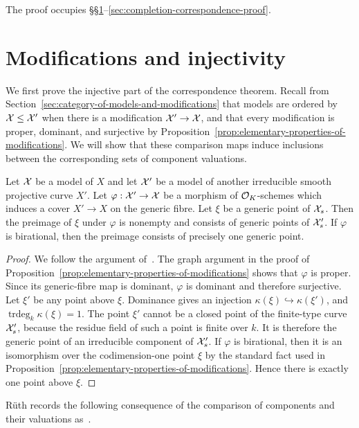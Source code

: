 \medskip\noindent
The proof occupies \S\S\ref{sec:modifications-and-injectivity}--\ref{sec:completion-correspondence-proof}.

\section{Modifications and injectivity}\label{sec:modifications-and-injectivity}
We first prove the injective part of the correspondence theorem.
Recall from Section~\ref{sec:category-of-models-and-modifications} that models are ordered by $\mathcal X\leq\mathcal X'$ when there is a modification $\mathcal X'\to\mathcal X$, and that every modification is proper, dominant, and surjective by Proposition~\ref{prop:elementary-properties-of-modifications}.
We will show that these comparison maps induce inclusions between the corresponding sets of component valuations.

\begin{lemma}\label{lem:preimageOfGenericPoint}
    Let $\mathcal X$ be a model of $X$ and let $\mathcal X'$ be a model of another irreducible smooth projective curve $X'$.
    Let $\varphi: \mathcal X' \to \mathcal X$ be a morphism of $\mathcal O_K $-schemes which induces a cover $X' \to X$ on the generic fibre.
    Let $\xi$ be a generic point of $\mathcal X_s$.
    Then the preimage of $\xi$ under $\varphi$ is nonempty and consists of generic points of $\mathcal X_s'$.
    If $\varphi$ is birational, then the preimage consists of precisely one generic point.
\end{lemma}

\begin{proof}
    We follow the argument of~\cite[Lemma 3.6]{Rueth}.
    The graph argument in the proof of Proposition~\ref{prop:elementary-properties-of-modifications} shows that $\varphi$ is proper.
    Since its generic-fibre map is dominant, $\varphi$ is dominant and therefore surjective.
    Let $\xi'$ be any point above $\xi$.
    Dominance gives an injection $\kappa(\xi)\hookrightarrow\kappa(\xi')$, and $\operatorname{trdeg}_k\kappa(\xi)=1$.
    The point $\xi'$ cannot be a closed point of the finite-type curve $\mathcal X'_s$, because the residue field of such a point is finite over $k$.
    It is therefore the generic point of an irreducible component of $\mathcal X'_s$.
    If $\varphi$ is birational, then it is an isomorphism over the codimension-one point $\xi$ by the standard fact used in Proposition~\ref{prop:elementary-properties-of-modifications}.
    Hence there is exactly one point above $\xi$.
\end{proof}

Rüth records the following consequence of the comparison of components and their valuations as~\cite[Lemma 3.7]{Rueth}.

